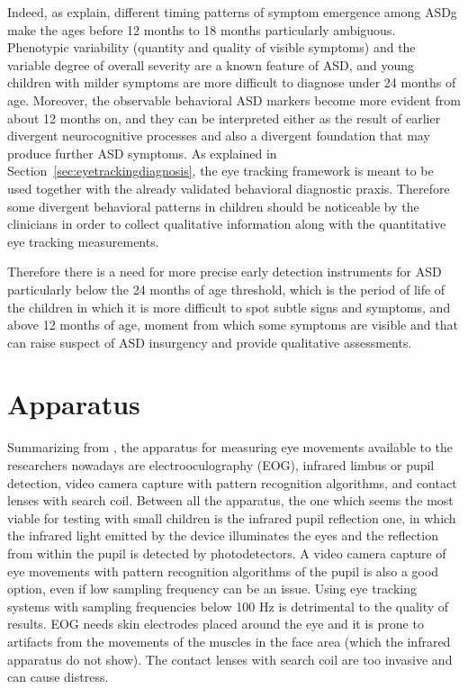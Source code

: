 Indeed, as \cite{towie2016screening} explain, different timing patterns of symptom emergence among ASDg make the ages before 12 months to 18 months particularly ambiguous. Phenotypic variability (quantity and quality of visible symptoms) and the variable degree of overall severity are a known feature of ASD, and young children with milder symptoms are more difficult to diagnose under 24 months of age. Moreover, the observable behavioral ASD markers become more evident from about 12 months on, and they can be interpreted either as the result of earlier divergent neurocognitive processes and also a divergent foundation that may produce further ASD symptoms. As explained in Section~\ref{sec:eyetrackingdiagnosis}, the eye tracking framework is meant to be used together with the already validated behavioral diagnostic praxis. Therefore some divergent behavioral patterns in children should be noticeable by the clinicians in order to collect qualitative information along with the quantitative eye tracking measurements.

Therefore there is a need for more precise early detection instruments for ASD particularly below the 24 months of age threshold, which is the period of life of the children in which it is more difficult to spot subtle signs and symptoms, and above 12 months of age, moment from which some symptoms are visible and that can raise suspect of ASD insurgency and provide qualitative assessments.

\section{Apparatus}
\label{sec:fwkapparatus}

Summarizing from \cite{smyrnis2008guidelines}, the apparatus for measuring eye movements available to the researchers nowadays are electrooculography (EOG), infrared limbus or pupil detection, video camera capture with pattern recognition algorithms, and contact lenses with search coil.
Between all the apparatus, the one which seems the most viable for testing with small children is the infrared pupil reflection one, in which the infrared light emitted by the device illuminates the eyes and the reflection from within the pupil is detected by photodetectors. A video camera capture of eye movements with pattern recognition algorithms of the pupil is also a good option, even if low sampling frequency can be an issue. Using eye tracking systems with sampling frequencies below 100 Hz is detrimental to the quality of results.
EOG needs skin electrodes placed around the eye and it is prone to artifacts from the movements of the muscles in the face area (which the infrared apparatus do not show). The contact lenses with search coil are too invasive and can cause distress.

